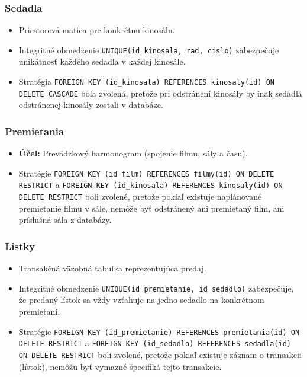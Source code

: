 \documentclass[11pt, a4paper]{article}
\begin{document}
\subsubsection{Sedadla}
\begin{itemize}
    \item Priestorová matica pre konkrétnu kinosálu.
    \item Integritné obmedzenie \texttt{UNIQUE(id\_kinosala, rad, cislo)} zabezpečuje unikátnosť každého sedadla v každej kinosále. 
    \item Stratégia \texttt{FOREIGN KEY (id\_kinosala) REFERENCES kinosaly(id) ON DELETE CASCADE} bola zvolená, pretože pri odstránení kinosály by inak sedadlá odstránenej kinosály zostali v databáze.
\end{itemize}

\subsubsection{Premietania}
\begin{itemize}
    \item \textbf{Účel:} Prevádzkový harmonogram (spojenie filmu, sály a času).
    \item Stratégie \texttt{FOREIGN KEY (id\_film) REFERENCES filmy(id) ON DELETE RESTRICT} a \texttt{FOREIGN KEY (id\_kinosala) REFERENCES kinosaly(id) ON DELETE RESTRICT} boli zvolené, pretože pokiaľ existuje naplánované premietanie filmu v sále, nemôže byť odstránený ani premietaný film, ani príslušná sála z databázy.
\end{itemize}

\subsubsection{Listky}
\begin{itemize}
    \item Transakčná väzobná tabuľka reprezentujúca predaj.
    \item Integritné obmedzenie \texttt{UNIQUE(id\_premietanie, id\_sedadlo)} zabezpečuje, že predaný lístok sa vždy vzťahuje na jedno sedadlo na konkrétnom premietaní.
    \item Stratégie \texttt{FOREIGN KEY (id\_premietanie) REFERENCES premietania(id) ON DELETE RESTRICT} a \texttt{FOREIGN KEY (id\_sedadlo) REFERENCES sedadla(id) ON DELETE RESTRICT} boli zvolené, pretože pokiaľ existuje záznam o transakcii (lístok), nemôžu byť vymazné špecifiká tejto transakcie.
\end{itemize}
\end{document}
